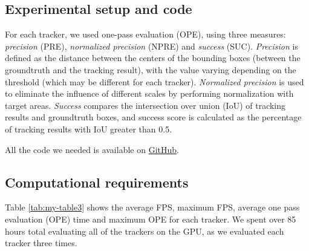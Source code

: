 \subsection{Experimental setup and code}
For each tracker, we used one-pass evaluation (OPE), using three measures: \textit{precision} (PRE), \textit{normalized precision} (NPRE) and  \textit{success} (SUC). \textit{Precision} is defined as the distance between the centers of the bounding boxes (between the groundtruth and the tracking result), with the value varying depending on the threshold (which may be different for each tracker). \textit{Normalized precision} is used to eliminate the influence of different scales by performing normalization with target areas. \textit{Success} compares the intersection over union (IoU) of tracking results and groundtruth boxes, and success score is calculated as the percentage of tracking results with IoU greater than 0.5.

All the code we needed is available on \href{https://anonymous.4open.science/r/TOTB-reproducability-009A/}{GitHub}.


\subsection{Computational requirements}
Table \ref{tab:my-table3} shows the average FPS, maximum FPS, average one pass evaluation (OPE) time and maximum OPE for each tracker. We spent over 85 hours total evaluating all of the trackers on the GPU, as we evaluated each tracker three times.


\begin{table}[h]
\centering
\caption{Each tracker's average FPS, maximum FPS, average one pass time and maximum OPE. We run each tracker three times.}
\label{tab:my-table3}
\end{table}
